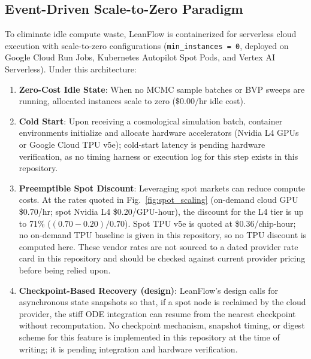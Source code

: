 \documentclass[11pt,a4paper]{article}
\begin{document}
\subsection{Event-Driven Scale-to-Zero Paradigm}
To eliminate idle compute waste, LeanFlow is containerized for serverless cloud execution with scale-to-zero configurations (\texttt{min\_instances = 0}, deployed on Google Cloud Run Jobs, Kubernetes Autopilot Spot Pods, and Vertex AI Serverless). Under this architecture:
\begin{enumerate}
    \item \textbf{Zero-Cost Idle State}: When no MCMC sample batches or BVP sweeps are running, allocated instances scale to zero ($\$0.00/\text{hr}$ idle cost).
    \item \textbf{Cold Start}: Upon receiving a cosmological simulation batch, container environments initialize and allocate hardware accelerators (Nvidia L4 GPUs or Google Cloud TPU v5e); cold-start latency is pending hardware verification, as no timing harness or execution log for this step exists in this repository.
    \item \textbf{Preemptible Spot Discount}: Leveraging spot markets can reduce compute costs. At the rates quoted in Fig.~\ref{fig:spot_scaling} (on-demand cloud GPU \$0.70/hr; spot Nvidia L4 \$0.20/GPU-hour), the discount for the L4 tier is up to 71\% ($(0.70-0.20)/0.70$). Spot TPU v5e is quoted at \$0.36/chip-hour; no on-demand TPU baseline is given in this repository, so no TPU discount is computed here. These vendor rates are not sourced to a dated provider rate card in this repository and should be checked against current provider pricing before being relied upon.
    \item \textbf{Checkpoint-Based Recovery (design)}: LeanFlow's design calls for asynchronous state snapshots so that, if a spot node is reclaimed by the cloud provider, the stiff ODE integration can resume from the nearest checkpoint without recomputation. No checkpoint mechanism, snapshot timing, or digest scheme for this feature is implemented in this repository at the time of writing; it is pending integration and hardware verification.
\end{enumerate}
\end{document}

